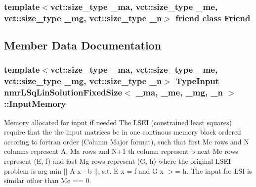 \subsubsection[{Friend}]{\setlength{\rightskip}{0pt plus 5cm}template$<$vct\+::size\+\_\+type \+\_\+ma, vct\+::size\+\_\+type \+\_\+me, vct\+::size\+\_\+type \+\_\+mg, vct\+::size\+\_\+type \+\_\+n$>$ friend class {\bf Friend}\hspace{0.3cm}{\ttfamily [friend]}}\label{classnmr_l_sq_lin_solution_fixed_size_a7f8321d57e81bc613d5dbef3410ba70e}


\subsection{Member Data Documentation}
\hypertarget{classnmr_l_sq_lin_solution_fixed_size_aabb06ec545a84d0e6cf73353c88d7bba}{}
\subsubsection[{Input\+Memory}]{\setlength{\rightskip}{0pt plus 5cm}template$<$vct\+::size\+\_\+type \+\_\+ma, vct\+::size\+\_\+type \+\_\+me, vct\+::size\+\_\+type \+\_\+mg, vct\+::size\+\_\+type \+\_\+n$>$ {\bf Type\+Input} {\bf nmr\+L\+Sq\+Lin\+Solution\+Fixed\+Size}$<$ \+\_\+ma, \+\_\+me, \+\_\+mg, \+\_\+n $>$\+::Input\+Memory\hspace{0.3cm}{\ttfamily [protected]}}\label{classnmr_l_sq_lin_solution_fixed_size_aabb06ec545a84d0e6cf73353c88d7bba}
Memory allocated for input if needed The L\+S\+E\+I (constrained least squares) require that the the input matrices be in one continous memory block ordered accoring to fortran order (Column Major format), such that first Mc rows and N columns represent A, Ma rows and N+1 th column represent b next Me rows represent (E, f) and last Mg rows represent (G, h) where the original L\+S\+E\+I problem is arg min $\vert$$\vert$ A x -\/ b $\vert$$\vert$, s.\+t. E x = f and G x $>$= h. The input for L\+S\+I is similar other than Me == 0. \hypertarget{classnmr_l_sq_lin_solution_fixed_size_a679c28e537d3e2c4d0be4592715715eb}{}
